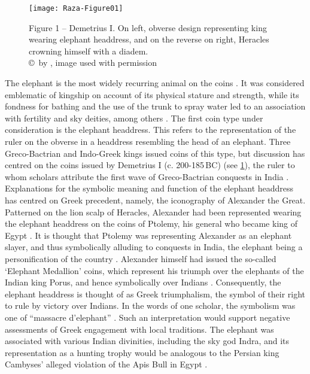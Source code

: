 \documentclass{ijsra}
\renewcommand\BC{{\,BC\xspace}}
\begin{document}
\begin{figure}[!htb] %
	\centering
	\texttt{[image: Raza-Figure01]}
	\caption{Figure 1 – Demetrius I. On left, obverse design representing king wearing elephant headdress, and on the reverse on right, Heracles crowning himself with a diadem.
		{\normalfont\scriptsize \\ \copyright\ by \citeauthor{Coin}, image used with permission}}
	\label{fig:Raza-Figure01}
\end{figure}

The elephant is the most widely recurring animal on the coins \parencite[383--384]{Bopearachchi1991}.
It was considered emblematic of kingship on account of its physical stature and strength,
while its fondness for bathing and the use of the trunk to spray water led to an association with fertility and sky deities,
among others \parencites[15--19]{Gupta1983}[156]{Iossif2010}.
The first coin type under consideration is the elephant headdress.
This refers to the representation of the ruler on the obverse in a headdress resembling the head of an elephant.
Three Greco-Bactrian and Indo-Greek kings issued coins of this type, but discussion has centred on the coins issued by Demetrius I
(c. 200-185\BC) (see \cref{fig:Raza-Figure01}), the ruler to whom scholars attribute the first wave of Greco-Bactrian conquests in India
\parencites[47--48]{Bopearachchi2011}[17--18]{Kalita1997}.
Explanations for the symbolic meaning and function of the elephant headdress has centred on Greek precedent,
namely, the iconography of Alexander the Great.
Patterned on the lion scalp of Heracles, Alexander had been represented wearing the elephant headdress on the coins of Ptolemy,
his general who became king of Egypt \parencite[21--31]{Lorber2012}.
It is thought that Ptolemy was representing Alexander as an elephant slayer, and thus symbolically alluding to conquests in India,
the elephant being a personification of the country \parencites[50]{Curtis2007}[335]{Green1993}[104--105]{MacDowall2007a}.
Alexander himself had issued the so-called ‘Elephant Medallion’ coins, which represent his triumph over the elephants of the Indian
king Porus, and hence symbolically over Indians \parencite[151--152]{Holt2003}.
Consequently, the elephant headdress is thought of as Greek triumphalism, the symbol of their right to rule by victory over Indians.
In the words of one scholar, the symbolism was one of “massacre d’elephant” \parencite[232, 492]{Widemann2009}.
Such an interpretation would support negative assessments of Greek engagement with local traditions.
The elephant was associated with various Indian divinities, including the sky god Indra, and its representation as a hunting trophy
would be analogous to the Persian king Cambyses’ alleged violation of the Apis Bull in Egypt \parencite[15--19]{Gupta1983}.
\end{document}
